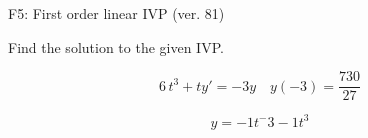 \begin{exercise}
  \begin{exerciseTitle}F5: First order linear IVP (ver. 81)\end{exerciseTitle}
  \begin{exerciseStatement}
    
Find the solution to the given IVP.

    
\[6 \, t^{3} +ty'= -3 y \hspace{1em} y( -3 ) = \frac{730}{27}\]

  \end{exerciseStatement}
  \begin{exerciseAnswer}
    
\[y= -1 t^ -3 -1 t^{3}\]

  \end{exerciseAnswer}
\end{exercise}